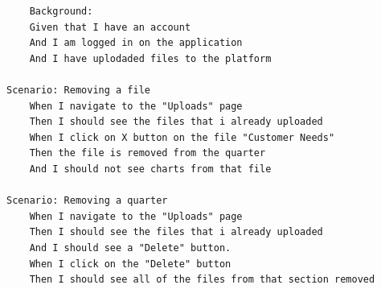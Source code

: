 \begin{verbatim}
    Background:  
	Given that I have an account
	And I am logged in on the application
	And I have uplodaded files to the platform
 
Scenario: Removing a file
	When I navigate to the "Uploads" page  
	Then I should see the files that i already uploaded
	When I click on X button on the file "Customer Needs"
	Then the file is removed from the quarter
	And I should not see charts from that file
	
Scenario: Removing a quarter
	When I navigate to the "Uploads" page  
	Then I should see the files that i already uploaded
	And I should see a "Delete" button.
	When I click on the "Delete" button
	Then I should see all of the files from that section removed 
\end{verbatim}